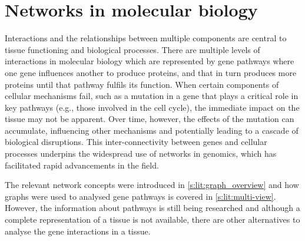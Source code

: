 \section{Networks in molecular biology} \label{s:lit:nets_bio}

\vspace{3mm}
\vspace{3mm}

Interactions and the relationships between multiple components are central to tissue functioning and biological processes. There are multiple levels of interactions in molecular biology which are represented by gene pathways where one gene influences another to produce proteins, and that in turn produces more proteins until that pathway fulfils its function. When certain components of cellular mechanisms fail, such as a mutation in a gene that plays a critical role in key pathways (e.g., those involved in the cell cycle), the immediate impact on the tissue may not be apparent. Over time, however, the effects of the mutation can accumulate, influencing other mechanisms and potentially leading to a cascade of biological disruptions. This inter-connectivity between genes and cellular processes underpins the widespread use of networks in genomics, which has facilitated rapid advancements in the field.

The relevant network concepts were introduced in \cref{s:lit:graph_overview} and how graphs were used to analysed gene pathways is covered in \cref{s:lit:multi-view}. However, the information about pathways is still being researched and although a complete representation of a tissue is not available, there are other alternatives to analyse the gene interactions in a tissue.

